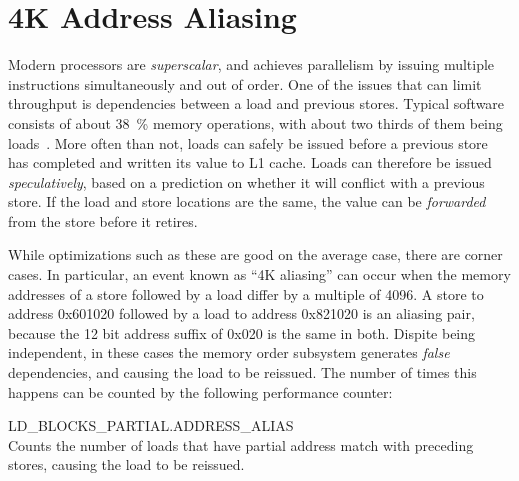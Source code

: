 \documentclass[a4paper,10pt,twocolumn,twoside]{article}
\begin{document}
\section{4K Address Aliasing}
Modern processors are \emph{superscalar}, and achieves parallelism by issuing multiple instructions simultaneously and out of order.
One of the issues that can limit throughput is dependencies between a load and previous stores.
Typical software consists of about 38~\% memory operations, with about two thirds of them being loads~\cite{Intel:2006:InsideICM:SmartMemoryAccess}.
More often than not, loads can safely be issued before a previous store has completed and written its value to L1 cache.
Loads can therefore be issued \emph{speculatively}, based on a prediction on whether it will conflict with a previous store.
If the load and store locations are the same, the value can be \emph{forwarded} from the store before it retires.

While optimizations such as these are good on the average case, there are corner cases. 
In particular, an event known as ``4K aliasing'' can occur when the memory addresses of a store followed by a load differ by a multiple of 4096.
A store to address 0x601020 followed by a load to address 0x821020 is an aliasing pair, because the 12 bit address suffix of 0x020 is the same in both. 
Dispite being independent, in these cases the memory order subsystem generates \emph{false} dependencies, and causing the load to be reissued.
The number of times this happens can be counted by the following performance counter:
\begin{description}
  \item{LD\_BLOCKS\_PARTIAL.ADDRESS\_ALIAS} \hfill \\
  Counts the number of loads that have partial address match with preceding stores, causing the load to be reissued.~\cite{Intel:2012:OptimizationManual}
\end{description}
\end{document}
